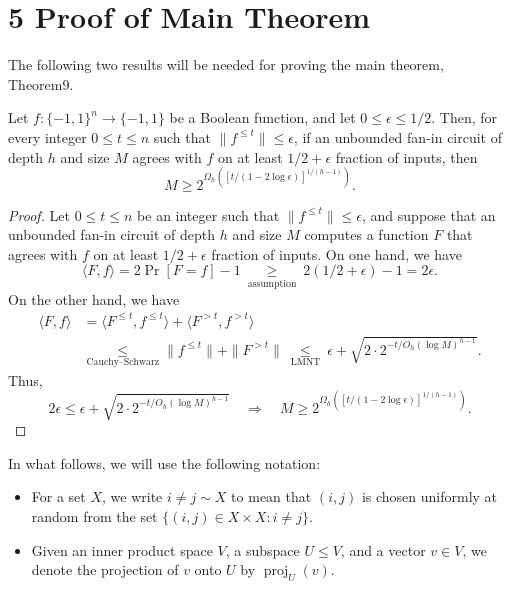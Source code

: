 \section*{5 Proof of Main Theorem}
The following two results will be needed for proving the main theorem, Theorem9.
\setcounter{nttheorem}{17}
\begin{ntproposition}
Let $f:\{-1,1\}^n\to\{-1,1\}$ be a Boolean function, and let $0\leq\epsilon\leq1/2$. Then, for every integer $0\leq t\leq n$ such that $\|f^{\leq t}\|\leq\epsilon$, if an unbounded fan-in circuit of depth $h$ and size $M$ agrees with $f$ on at least $1/2+\epsilon$ fraction of inputs, then
\[M\geq2^{\Omega_h([t/(1-2\log\epsilon)]^{1/(h-1)})}.\]
\end{ntproposition}
\begin{proof}
Let $0\leq t\leq n$ be an integer such that $\|f^{\leq t}\|\leq\epsilon$, and suppose that an unbounded fan-in circuit of depth $h$ and size $M$ computes a function $F$ that agrees with $f$ on at least $1/2+\epsilon$ fraction of inputs.
On one hand, we have
\[\langle F,f\rangle=2\Pr[F=f]-1\ \underset{\text{assumption}}\geq\ 2(1/2+\epsilon)-1=2\epsilon.\]
On the other hand, we have
\begin{align*}\langle F,f\rangle&=\langle F^{\leq t},f^{\leq t}\rangle+\langle F^{>t},f^{>t}\rangle\\&\underset{\text{Cauchy--Schwarz}}\leq\|f^{\leq t}\|+\|F^{>t}\|\ \underset{\text{LMNT}}\leq\ \epsilon+\sqrt{2\cdot2^{-t/O_h(\log M)^{h-1}}}.\end{align*}
Thus,
\[2\epsilon\leq\epsilon+\sqrt{2\cdot2^{-t/O_h(\log M)^{h-1}}}\quad\Longrightarrow\quad M\geq2^{\Omega_h([t/(1-2\log\epsilon)]^{1/(h-1)})}.\]
\end{proof}
In what follows, we will use the following notation:
\begin{itemize}
\item For a set $X$, we write $i\ne j\sim X$ to mean that $(i,j)$ is chosen uniformly at random from the set $\{(i,j)\in X\times X:i\ne j\}$.
\item Given an inner product space $V$, a subspace $U\leq V$, and a vector $v\in V$, we denote the projection of $v$ onto $U$ by $\operatorname{proj}_U(v)$.
\end{itemize}
